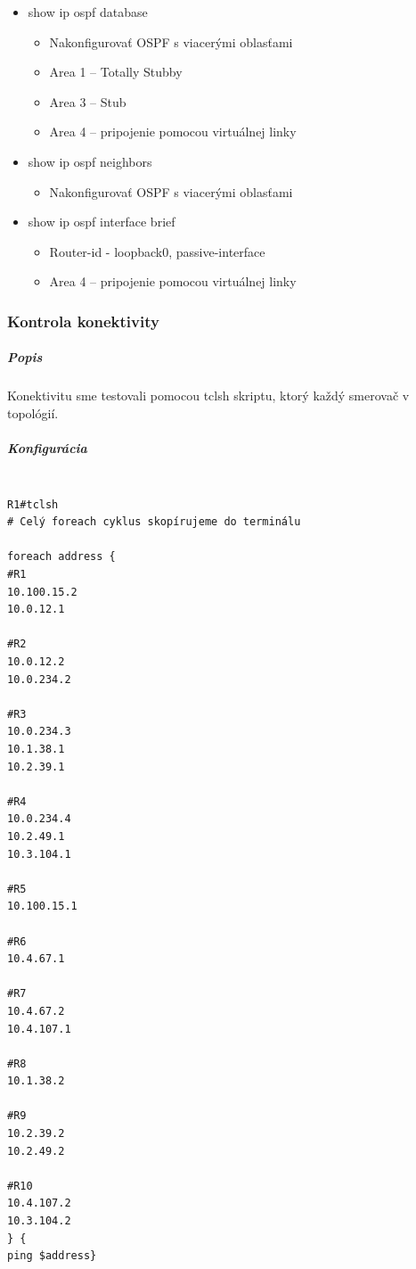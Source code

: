 \documentclass[12pt,twoside,a4paper]{article}
\begin{document}
\begin{itemize}
\item show ip ospf database
	\begin{itemize}
	\item Nakonfigurovať OSPF s viacerými oblasťami
	\item Area 1 – Totally Stubby
	\item Area 3 – Stub
	\item Area 4 – pripojenie pomocou virtuálnej linky
	\end{itemize}
\item show ip ospf neighbors 
	\begin{itemize}
	\item Nakonfigurovať OSPF s viacerými oblasťami
	\end{itemize}
\item show ip ospf interface brief
	\begin{itemize}
	\item Router-id - loopback0, passive-interface
	\item Area 4 – pripojenie pomocou virtuálnej linky
	\end{itemize}
\end{itemize}


\subsubsection*{Kontrola konektivity}
\subparagraph{Popis}
\subparagraph{}
Konektivitu sme testovali pomocou tclsh skriptu, ktorý  každý smerovač v topológií.

\subparagraph{Konfigurácia}

\noindent
{\selectfont
\begin{small}
\begin{verbatim}

R1#tclsh
# Celý foreach cyklus skopírujeme do terminálu

foreach address {
#R1
10.100.15.2
10.0.12.1

#R2
10.0.12.2
10.0.234.2

#R3
10.0.234.3
10.1.38.1
10.2.39.1

#R4
10.0.234.4
10.2.49.1
10.3.104.1

#R5
10.100.15.1

#R6
10.4.67.1

#R7
10.4.67.2
10.4.107.1

#R8
10.1.38.2

#R9
10.2.39.2
10.2.49.2

#R10
10.4.107.2
10.3.104.2
} {
ping $address}

\end{verbatim}
\end{small}
}
\end{document}
